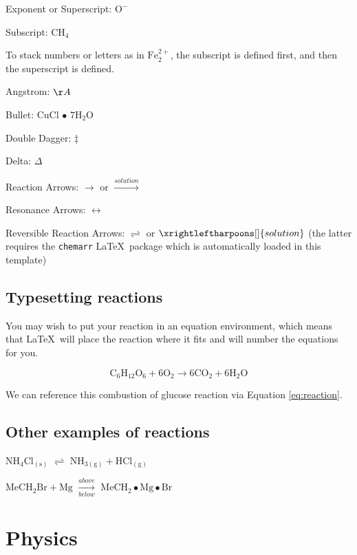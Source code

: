 \documentclass[12pt,twoside]{reedthesis}
\begin{document}
  \noindent Exponent or Superscript: \(\mathrm{O^-}\)
  
  \noindent Subscript: \(\mathrm{CH_4}\)
  
  To stack numbers or letters as in \(\mathrm{Fe_2^{2+}}\), the subscript
  is defined first, and then the superscript is defined.
  
  \noindent Angstrom: \({\AA}\)
  
  \noindent Bullet: CuCl \(\bullet\) \(\mathrm{7H_{2}O}\)
  
  \noindent Double Dagger: \(\ddag\)
  
  \noindent Delta: \(\Delta\)
  
  \noindent Reaction Arrows: \(\longrightarrow\) or
  \(\xrightarrow{solution}\)
  
  \noindent Resonance Arrows: \(\leftrightarrow\)
  
  \noindent Reversible Reaction Arrows: \(\rightleftharpoons\) or
  \(\xrightleftharpoons[ ]{solution}\) (the latter requires the
  \texttt{chemarr} \LaTeX~package which is automatically loaded in this
  template)
  
  \subsection{Typesetting reactions}\label{typesetting-reactions}
  
  You may wish to put your reaction in an equation environment, which
  means that \LaTeX~will place the reaction where it fits and will number
  the equations for you.
  
  \begin{equation}
    \mathrm{C_6H_{12}O_6  + 6O_2} \longrightarrow \mathrm{6CO_2 + 6H_2O}
    \label{eq:reaction}
  \end{equation}
  
  We can reference this combustion of glucose reaction via Equation
  \ref{eq:reaction}.
  
  \subsection{Other examples of
  reactions}\label{other-examples-of-reactions}
  
  \(\mathrm{NH_4Cl_{(s)}}\) \(\rightleftharpoons\)
  \(\mathrm{NH_{3(g)}+HCl_{(g)}}\)
  
  \noindent \(\mathrm{MeCH_2Br + Mg}\) \(\xrightarrow[below]{above}\)
  \(\mathrm{MeCH_2\bullet Mg \bullet Br}\)
  
  \section{Physics}\label{physics}
  
\end{document}
